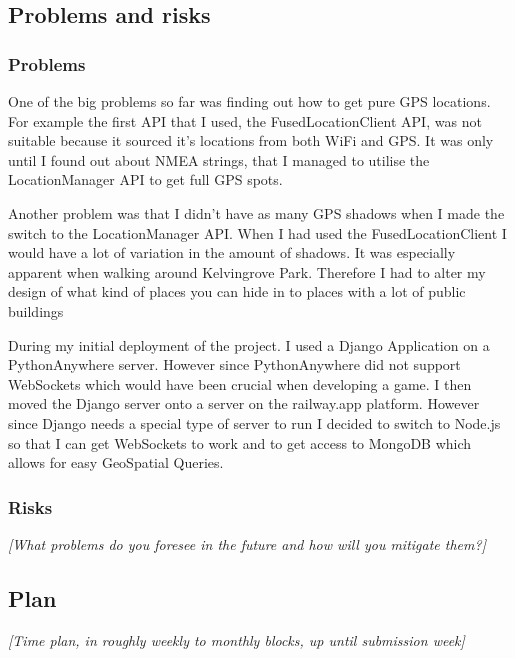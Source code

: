 \documentclass[11pt]{article}
\begin{document}
\subsection{Problems and risks}\label{problems-and-risks}

\subsubsection{Problems}\label{problems}

One of the big problems so far was finding out how to get pure GPS locations. For example the first API that I used, the FusedLocationClient
API, was not suitable because it sourced it's locations from both WiFi and GPS. It was only until I found out about NMEA strings, that I managed
to utilise the LocationManager API to get full GPS spots.

\par
Another problem was that I didn't have as many GPS shadows when I made the switch to the LocationManager API. When I had used the FusedLocationClient
I would have a lot of variation in the amount of shadows. It was especially apparent when walking around Kelvingrove Park. Therefore I had to alter
my design of what kind of places you can hide in to places with a lot of public buildings
\par
During my initial deployment of the project. I used a Django Application on a PythonAnywhere server. However since PythonAnywhere did not support
WebSockets which would have been crucial when developing a game. I then moved the Django server onto a server on the railway.app platform. However
since Django needs a special type of server to run I decided to switch to Node.js so that I can get WebSockets to work and to get access to MongoDB
which allows for easy GeoSpatial Queries.

\subsubsection{Risks}\label{risks}

\emph{{[}What problems do you foresee in the future and how will you
mitigate them?{]}}

\subsection{Plan}\label{plan}

\emph{{[}Time plan, in roughly weekly to monthly blocks, up until
submission week{]}}
\end{document}
